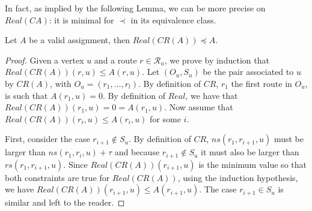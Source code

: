 In fact, as implied by the following Lemma, we can be more precise on $Real(CA)$: it is minimal for $\prec$ in its equivalence class.

\begin{lemma}\label{lemma:prec}
Let $A$ be a valid assignment, then $Real(CR(A)) \preceq A$.
\end{lemma}
\begin{proof}
Given a vertex $u$ and a route $r \in \mathcal{R}_u$, we prove by induction that $Real(CR(A))(r,u) \leq A(r,u)$.
Let $(O_u,S_u)$ be the pair associated to $u$ by $CR(A)$, with $O_u = (r_1,\dots,r_l)$. By definition of $CR$, $r_1$ the first route in $O_u$, is such that $A(r_1,u) = 0$. By definition of $Real$, we have that  $Real(CR(A))(r_1,u) = 0 = A(r_1,u)$.
Now assume that $Real(CR(A))(r_i,u) \leq A(r_i,u)$ for some $i$. 

First, consider the case $r_{i+1} \notin S_u$. By definition of $CR$, $ns(r_1,r_{i+1},u)$ must be larger than 
$ns(r_1,r_{i},u)+ \tau$ and because $r_{i+1} \notin S_u$ it must also be larger than $rs(r_1,r_{i+1},u)$. 
Since $Real(CR(A))(r_{i+1},u)$ is the minimum value so that both constraints are true for $Real(CR(A))$, using
the induction hypothesis, we have $Real(CR(A))(r_{i+1},u) \leq A(r_{i+1},u)$. The case $r_{i+1} \in S_u$ is similar and left to the reader.
\end{proof}


% 
% 
% 
% 
% 


